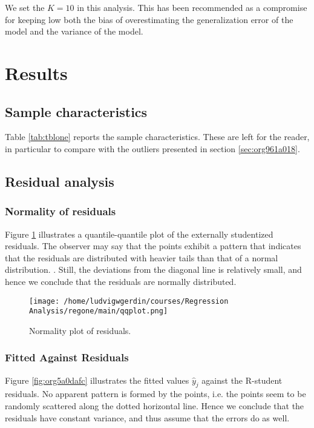 \documentclass[11pt]{article}
\begin{document}
We set the \(K = 10\) in this analysis. This has been recommended as a compromise for keeping low both the bias of 
overestimating the generalization error of the model and the variance of the model.
\cite{hastie2009elements}

\newpage
\section{Results}
\label{sec:org8c60fac}
\subsection{Sample characteristics}
\label{sec:org7f7e073}

Table \ref{tab:tblone} reports the sample characteristics. These are left for the reader, in particular to
compare with the outliers presented in section \ref{sec:org961a018}.



\subsection{Residual analysis}
\label{sec:org60cd2c4}
\subsubsection{Normality of residuals}
\label{sec:org0106984}

Figure \ref{fig:orgf4b4255} illustrates a quantile-quantile plot of the externally studentized residuals.
The observer may say that the points exhibit a pattern that indicates that the residuals are distributed with
heavier tails than that of a normal distribution. \cite{Montgomery2012}. Still, the deviations from the
diagonal line is relatively small, and hence we conclude that the residuals are normally distributed.

\begin{figure}[htbp]
\centering
\texttt{[image: /home/ludvigwgerdin/courses/Regression Analysis/regone/main/qqplot.png]}
\caption{\label{fig:orgf4b4255}
Normality plot of residuals.}
\end{figure}

\subsubsection{Fitted Against Residuals}
\label{sec:org82335d8}

Figure \ref{fig:org5a0dafc} illustrates the fitted values \(\hat y_j\) against the R-student residuals. No apparent 
pattern is formed by the points, i.e. the points seem to be randomly scattered along the dotted horizontal
line. Hence we conclude that the residuals have constant variance, and thus assume that the errors do
as well.
\end{document}
